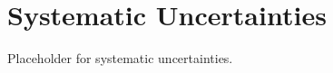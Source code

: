 \chapter{Systematic Uncertainties}
\label{ch:systematics}

Placeholder for systematic uncertainties.
